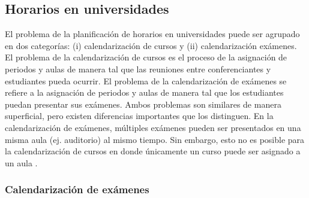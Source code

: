 \documentclass[draft,12pt,headsepline,footsepline,paper=letter]{scrreprt}
\begin{document}
\subsection{Horarios en universidades}

El problema de la planificación de horarios en universidades puede ser agrupado en dos categorías: (i) calendarización de cursos y (ii) calendarización exámenes.
El problema de la calendarización de cursos es el proceso de la asignación de periodos y aulas de manera tal que las reuniones entre conferenciantes y estudiantes pueda ocurrir.
El problema de la calendarización de exámenes se refiere a la asignación de periodos y aulas de manera tal que los estudiantes puedan presentar sus exámenes.
Ambos problemas son similares de manera superficial, pero existen diferencias importantes que los distinguen.
En la calendarización de exámenes, múltiples exámenes pueden ser presentados en una misma aula (ej. auditorio) al mismo tiempo.
Sin embargo, esto no es posible para la calendarización de cursos en donde únicamente un curso puede ser asignado a un aula \citep[p.~11]{abdullah06heuristic-approaches}.

\subsubsection{Calendarización de exámenes}
\end{document}
